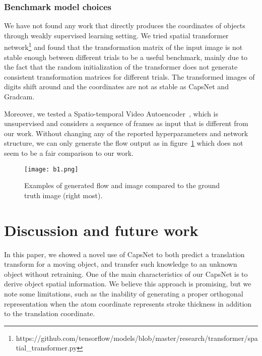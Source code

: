 \documentclass{article}
\begin{document}
\subsubsection{Benchmark model choices}
We have not found any work that directly produces the coordinates of objects through weakly supervised learning setting. We tried spatial transformer network\footnote{https://github.com/tensorflow/models/blob/master/research/\linebreak transformer/spatial\_transformer.py} and found that the transformation matrix of the input image is not stable enough between different trials to be a useful benchmark, mainly due to the fact that the random initialization of the transformer does not generate consistent transformation matrices for different trials. The transformed images of digits shift around and the coordinates are not as stable as CapsNet and Gradcam. 

Moreover, we tested a Spatio-temporal Video Autoencoder~\cite{patraucean2015spatio}, which is unsupervised and considers a sequence of frames as input that is different from our work. Without changing any of the reported hyperparameters and network structure, we can only generate the flow output as in figure~\ref{fig:bench1} which does not seem to be a fair comparison to our work. 

\begin{figure}
\centering
\texttt{[image: b1.png]}
\caption{Examples of generated flow and image compared to the ground truth image (right most). \label{fig:bench1}}
\end{figure}

\section{Discussion and future work}
In this paper, we showed a novel use of CapsNet to both predict a translation transform for a moving object, and transfer such knowledge to an unknown object without retraining. One of the main characteristics of our CapsNet is to derive object spatial information. We believe this approach is promising, but we note some limitations, such as the inability of generating a proper orthogonal representation when the atom coordinate represents stroke thickness in addition to the translation coordinate.
\pagebreak



\end{document}
